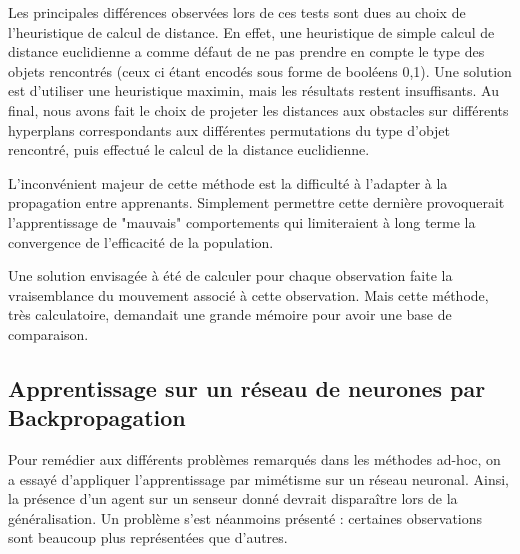 \documentclass[a4paper, 12pt]{report}
\begin{document}
	
Les principales différences observées lors de ces tests sont dues au choix de l'heuristique de calcul de distance. En effet, une heuristique de simple calcul de distance euclidienne a comme défaut de ne pas prendre en compte le type des objets rencontrés (ceux ci étant encodés sous forme de booléens 0,1). Une solution est d'utiliser une heuristique maximin, mais les résultats restent insuffisants.
Au final, nous avons fait le choix de projeter les distances aux obstacles sur différents hyperplans correspondants aux différentes permutations du type d'objet rencontré, puis effectué le calcul de la distance euclidienne.

L'inconvénient majeur de cette méthode est la difficulté à l'adapter à la propagation entre apprenants. Simplement permettre cette dernière provoquerait l'apprentissage de "mauvais" comportements qui limiteraient à long terme la convergence de l'efficacité de la population.

Une solution envisagée à été de calculer pour chaque observation faite la vraisemblance du mouvement associé à cette observation. Mais cette méthode, très calculatoire, demandait une grande mémoire pour avoir une base de comparaison.
	
	\subsection{Apprentissage sur un réseau de neurones par Backpropagation}
	Pour remédier aux différents problèmes remarqués dans les méthodes ad-hoc, on a essayé d'appliquer l'apprentissage par mimétisme sur un réseau neuronal. Ainsi, la présence d'un agent sur un senseur donné devrait disparaître lors de la généralisation.
	Un problème s'est néanmoins présenté : certaines observations sont beaucoup plus représentées que d'autres.
	
\end{document}
